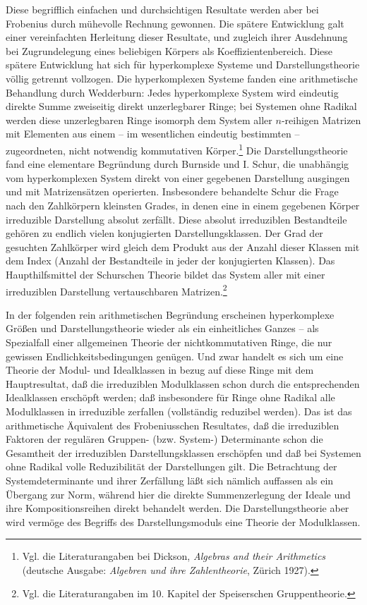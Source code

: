 \documentclass[11pt]{article}
\begin{document}
Diese begrifflich einfachen und durchsichtigen Resultate werden aber bei Frobenius durch mühevolle Rechnung gewonnen. Die spätere Entwicklung galt einer vereinfachten Herleitung dieser Resultate, und zugleich ihrer Ausdehnung bei Zugrundelegung eines beliebigen Körpers als Koeffizientenbereich. Diese spätere Entwicklung hat sich für hyperkomplexe Systeme und Darstellungstheorie völlig getrennt vollzogen. Die hyperkomplexen Systeme fanden eine arithmetische Behandlung durch Wedderburn: Jedes hyperkomplexe System wird eindeutig direkte Summe zweiseitig direkt unzerlegbarer Ringe; bei Systemen ohne Radikal werden diese unzerlegbaren Ringe isomorph dem System aller $n$-reihigen Matrizen mit Elementen aus einem -- im wesentlichen eindeutig bestimmten -- zugeordneten, nicht notwendig kommutativen Körper.\footnote{Vgl. die Literaturangaben bei Dickson, \emph{Algebras and their Arithmetics} (deutsche Ausgabe: \emph{Algebren und ihre Zahlentheorie}, Zürich 1927).} Die Darstellungstheorie fand eine elementare Begründung durch Burnside und I. Schur, die unabhängig vom hyperkomplexen System direkt von einer gegebenen Darstellung ausgingen und mit Matrizensätzen operierten. Insbesondere behandelte Schur die Frage nach den Zahlkörpern kleinsten Grades, in denen eine in einem gegebenen Körper irreduzible Darstellung absolut zerfällt. Diese absolut irreduziblen Bestandteile gehören zu endlich vielen konjugierten Darstellungsklassen. Der Grad der gesuchten Zahlkörper wird gleich dem Produkt aus der Anzahl dieser Klassen mit dem Index (Anzahl der Bestandteile in jeder der konjugierten Klassen). Das Haupthilfsmittel der Schurschen Theorie bildet das System aller mit einer irreduziblen Darstellung vertauschbaren Matrizen.\footnote{Vgl. die Literaturangaben im 10. Kapitel der Speiserschen Gruppentheorie.}

In der folgenden rein arithmetischen Begründung erscheinen hyperkomplexe Größen und Darstellungstheorie wieder als ein einheitliches Ganzes -- als Spezialfall einer allgemeinen Theorie der nichtkommutativen Ringe, die nur gewissen Endlichkeitsbedingungen genügen. Und zwar handelt es sich um eine Theorie der Modul- und Idealklassen in bezug auf diese Ringe mit dem Hauptresultat, daß die irreduziblen Modulklassen schon durch die entsprechenden Idealklassen erschöpft werden; daß insbesondere für Ringe ohne Radikal alle Modulklassen in irreduzible zerfallen (vollständig reduzibel werden). Das ist das arithmetische Äquivalent des Frobeniusschen Resultates, daß die irreduziblen Faktoren der regulären Gruppen- (bzw. System-) Determinante schon die Gesamtheit der irreduziblen Darstellungsklassen erschöpfen und daß bei Systemen ohne Radikal volle Reduzibilität der Darstellungen gilt. Die Betrachtung der Systemdeterminante und ihrer Zerfällung läßt sich nämlich auffassen als ein Übergang zur Norm, während hier die direkte Summenzerlegung der Ideale und ihre Kompositionsreihen direkt behandelt werden. Die Darstellungstheorie aber wird vermöge des Begriffs des Darstellungsmoduls eine Theorie der Modulklassen.
\end{document}
